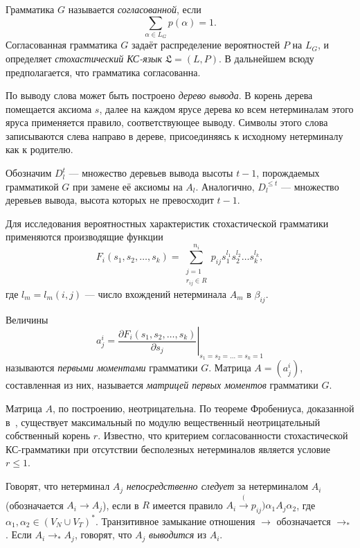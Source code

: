 \documentclass[11pt]{article}
\begin{document}
Грамматика $G$ называется \textit{согласованной}, если
\begin{equation}
    \sum_{\alpha \in L_G} p(\alpha) = 1.
\end{equation}
Согласованная грамматика $G$ задаёт распределение вероятностей $P$ на $L_G$, и определяет \textit{стохастический КС-язык} $\mathfrak{L} = (L, P)$. В дальнейшем всюду предполагается, что грамматика согласованна.

По выводу слова может быть построено \textit{дерево вывода}. В корень дерева помещается аксиома $s$, далее на каждом ярусе дерева ко всем нетерминалам этого яруса применяется правило, соответствующее выводу. Символы этого слова записываются слева направо в дереве, присоединяясь к исходному нетерминалу как к родителю.

Обозначим $D_l^t$ --- множество деревьев вывода высоты $t-1$, порождаемых грамматикой $G$ при замене её аксиомы на $A_l$. Аналогично, $D_l^{\leqslant t}$ --- множество деревьев вывода, высота которых не превосходит $t - 1$.

Для исследования вероятностных характеристик стохастической грамматики применяются производящие функции
\begin{equation}
    F_i(s_1, s_2, \ldots, s_k) = \sum_{\substack{j = 1\\r_{ij} \in R}}^{n_i} p_{ij} s_1^{l_1} s_2^{l_2} \ldots s_k^{l_k},
\end{equation}
где $l_m = l_m(i,j)$ --- число вхождений нетерминала $A_m$ в $\beta_{ij}$.

Величины
\begin{equation}
    a^i_j = \left. \frac{\partial F_i(s_1, s_2, \ldots, s_k)}{\partial s_j} \right|_{s_1 = s_2 = \ldots = s_k = 1}
\end{equation}
называются \textit{первыми моментами} грамматики $G$. Матрица $A = (a^i_j)$, составленная из них, называется \textit{матрицей первых моментов} грамматики $G$.


Матрица $A$, по построению, неотрицательна. По теореме Фробениуса, доказанной в~\cite{gantmaher}, существует максимальный по модулю вещественный неотрицательный собственный корень $r$. Известно, что критерием согласованности стохастической КС-грамматики при отсутствии бесполезных нетерминалов является условие $r \leqslant 1$.

Говорят, что нетерминал $A_j$ \textit{непосредственно следует} за нетерминалом $A_i$ (обозначается $A_i \rightarrow A_j$), если в $R$ имеется правило $A_i \xrightarrow(p_{ij}) \alpha_1 A_j \alpha_2$, где $\alpha_1, \alpha_2 \in (V_N \cup V_T)^*$. Транзитивное замыкание отношения $\rightarrow$ обозначается $\rightarrow_*$. Если $A_i \rightarrow_* A_j$, говорят, что $A_j$ \textit{выводится} из $A_i$.
\end{document}
